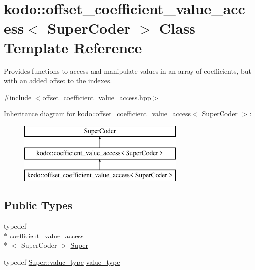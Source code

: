 \hypertarget{classkodo_1_1offset__coefficient__value__access}{\section{kodo\-:\-:offset\-\_\-coefficient\-\_\-value\-\_\-access$<$ Super\-Coder $>$ Class Template Reference}
\label{classkodo_1_1offset__coefficient__value__access}
}


Provides functions to access and manipulate values in an array of coefficients, but with an added offset to the indexes.  




{\ttfamily \#include $<$offset\-\_\-coefficient\-\_\-value\-\_\-access.\-hpp$>$}

Inheritance diagram for kodo\-:\-:offset\-\_\-coefficient\-\_\-value\-\_\-access$<$ Super\-Coder $>$\-:\begin{figure}[H]
\begin{center}
\leavevmode
\includegraphics[height=3.000000cm]{classkodo_1_1offset__coefficient__value__access}
\end{center}
\end{figure}
\subsection*{Public Types}
\begin{DoxyCompactItemize}
\item 
typedef \\*
\hyperlink{classkodo_1_1coefficient__value__access}{coefficient\-\_\-value\-\_\-access}\\*
$<$ Super\-Coder $>$ \hyperlink{classkodo_1_1offset__coefficient__value__access_afbb688e0f2bcccea653a5bc9becaa16f}{Super}
\item 
typedef \hyperlink{classkodo_1_1coefficient__value__access_a629750d630f4188d48eb49f76cf750f1}{Super\-::value\-\_\-type} \hyperlink{classkodo_1_1offset__coefficient__value__access_a4dc52c0872e6ef6bc528d2bfac18f5b7}{value\-\_\-type}
\begin{DoxyCompactList}\small\item\em \end{DoxyCompactList}\end{DoxyCompactItemize}

